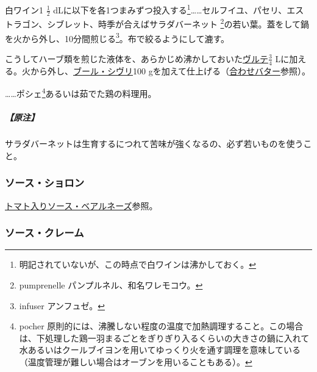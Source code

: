 \begin{recette}

 

白ワイン1 \(\frac{1}{2}\) dLに以下を各1つまみずつ投入する\footnote{明記されていないが、この時点で白ワインは沸かしておく。}\ldots{}\ldots{}セルフイユ、パセリ、エストラゴン、シブレット、時季が合えばサラダバーネット
\footnote{pumprenelle パンプルネル、和名ワレモコウ。}の若い葉。蓋をして鍋を火から外し、10分間煎じる\footnote{infuser
  アンフュゼ。}。布で絞るようにして漉す。

こうしてハーブ類を煎じた液体を、あらかじめ沸かしておいた\protect\hyperlink{veloute}{ヴルテ}\(\frac{3}{4}\)
Lに加える。火から外し、\protect\hyperlink{beurre-chivry}{ブール・シヴリ}100
gを加えて仕上げる（\protect\hyperlink{beurres-composes}{合わせバター}参照）。

\ldots{}\ldots{}ポシェ\footnote{pocher
  原則的には、沸騰しない程度の温度で加熱調理すること。この場合は、下処理した鶏一羽まるごとをぎりぎり入るくらいの大きさの鍋に入れて水あるいはクールブイヨンを用いてゆっくり火を通す調理を意味している（温度管理が難しい場合はオーブンを用いることもある）。}あるいは茹でた鶏の料理用。

\hypertarget{nota-sauce-chivry}{%
\subparagraph{【原注】}\label{nota-sauce-chivry}}

サラダバーネットは生育するにつれて苦味が強くなるの、必ず若いものを使うこと。

\atoaki{}

\hypertarget{sauce-choron}{%
\subsubsection{ソース・ショロン}\label{sauce-choron}}


\protect\hyperlink{sauce-bearnaise-tomatee}{トマト入りソース・ベアルネーズ}参照。

\atoaki{}

\hypertarget{sauce-creme}{%
\subsubsection{ソース・クレーム}\label{sauce-creme}}


 


\end{recette}

